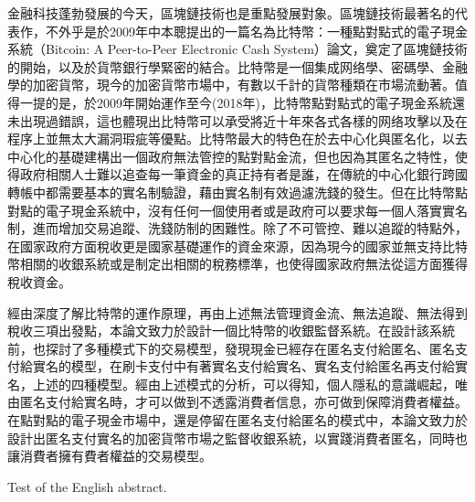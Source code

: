 \begin{cabstract}

	金融科技蓬勃發展的今天，區塊鏈技術也是重點發展對象。區塊鏈技術最著名的代表作，不外乎是於2009年中本聰提出的一篇名為比特幣：一種點對點式的電子現金系統（Bitcoin: A Peer-to-Peer Electronic Cash System）論文\parencite{bitcoinpaper}，奠定了區塊鏈技術的開始，以及於貨幣銀行學緊密的結合。比特幣是一個集成网络學、密碼學、金融學的加密貨幣，現今的加密貨幣市場中，有數以千計的貨幣種類在市場流動著。值得一提的是，於2009年開始運作至今(2018年)，比特幣點對點式的電子現金系統還未出現過錯誤，這也體現出比特幣可以承受將近十年來各式各樣的网络攻擊以及在程序上並無太⼤漏洞瑕疵等優點。比特幣最大的特色在於去中心化與匿名化，以去中⼼化的基礎建構出⼀個政府無法管控的點對點⾦流，但也因為其匿名之特性，使得政府相關人⼠難以追查每⼀筆資⾦的真正持有者是誰，在傳統的中心化銀行跨國轉帳中都需要基本的實名制驗證，藉由實名制有效過濾洗錢的發生。但在比特幣點對點的電子現金系統中，沒有任何一個使用者或是政府可以要求每一個人落實實名制，進而增加交易追蹤、洗錢防制的困難性。除了不可管控、難以追蹤的特點外，在國家政府方面稅收更是國家基礎運作的資⾦來源，因為現今的國家並無支持比特幣相關的收銀系統或是制定出相關的稅務標準，也使得國家政府無法從這方面獲得稅收資金。

	經由深度了解比特幣的運作原理，再由上述無法管理資金流、無法追蹤、無法得到稅收三項出發點，本論文致力於設計一個比特幣的收銀監督系統。在設計該系統前，也探討了多種模式下的交易模型，發現現金已經存在匿名支付給匿名、匿名支付給實名的模型，在刷卡支付中有著實名支付給實名、實名支付給匿名再支付給實名，上述的四種模型。經由上述模式的分析，可以得知，個人隱私的意識崛起，唯由匿名支付給實名時，才可以做到不透露消費者信息，亦可做到保障消費者權益。在點對點的電子現金市場中，還是停留在匿名支付給匿名的模式中，本論⽂致⼒於設計出匿名⽀付實名的加密貨幣市場之監督收銀系統，以實踐消費者匿名，同時也讓消費者擁有費者權益的交易模型。
\end{cabstract}

\begin{eabstract}
	Test of the English abstract.
\end{eabstract}

